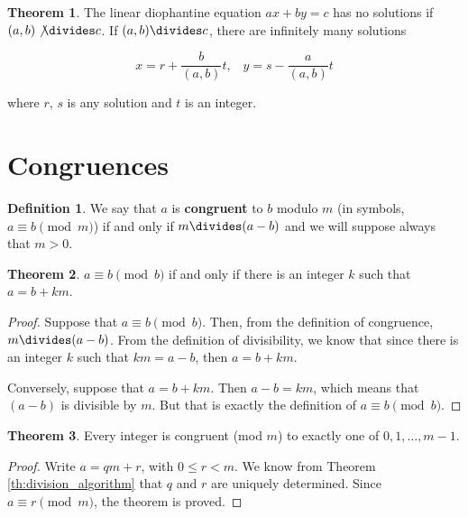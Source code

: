 \documentclass{article}
\theoremstyle{definition} %
\newtheorem{theorem}{Theorem}[section] %
\theoremstyle{definition}
\theoremstyle{definition}
\theoremstyle{definition}
\newtheorem{definition}{Definition}[section]
\begin{document}
  \begin{theorem}
    The linear diophantine equation $ax + by = c$ has no solutions if $(a, b) \not\divides c$. If $(a, b) \divides c$, there are
    infinitely many solutions
    
    \begin{equation*}
      x = r + \frac{b}{(a, b)}t,\;\;\;y = s - \frac{a}{(a, b)}t
    \end{equation*}
    
    where $r$, $s$ is any solution and $t$ is an integer.
  \end{theorem}
  
  \section{Congruences}
  
  \begin{definition}
    We say that $a$ is \textbf{congruent} to $b$ modulo $m$ (in symbols, $a \equiv b \pmod{m}$) if and only if $m \divides (a - b)$
    and we will suppose always that $m > 0$.
  \end{definition}
  
  \begin{theorem}
    $a \equiv b \pmod{b}$ if and only if there is an integer $k$ such that $a = b + km$.
  \end{theorem}
  
  \begin{proof}
    Suppose that $a \equiv b \pmod{b}$. Then, from the definition of congruence, $m \divides (a - b)$. From the definition of
    divisibility, we know that since there is an integer $k$ such that $km = a - b$, then $a = b + km$.
    
    Conversely, suppose that $a = b + km$. Then $a - b = km$, which means that $(a - b)$ is divisible by $m$. But that is exactly the definition
    of $a \equiv b \pmod{b}$.
  \end{proof}
  
  \begin{theorem}
    Every integer is congruent (mod $m$) to exactly one of $0, 1, \dots, m - 1$.
  \end{theorem}
  
  \begin{proof}
    Write $a = qm + r$, with $0 \leq r < m$. We know from Theorem \ref{th:division_algorithm} that $q$ and $r$ are uniquely determined.
    Since $a \equiv r \pmod{m}$, the theorem is proved.
  \end{proof}
  
\end{document}
